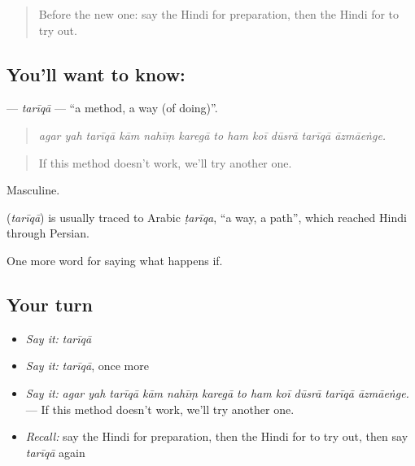 \label{lesson:HI-C392-tariqa}



\begin{quote}
Before the new one: say the Hindi for preparation, then the Hindi for to try out.
\end{quote}

\subsection*{You'll want to know: }
\textbf{} — \emph{tarīqā} — \textquotedblleft{}a method, a way (of doing)\textquotedblright{}.

\begin{quote}
           
\end{quote}

\begin{quote}
\emph{agar yah tarīqā kām nahīṃ karegā to ham koī dūsrā tarīqā āzmāeṅge.}
\end{quote}

\begin{quote}
If this method doesn't work, we'll try another one.
\end{quote}

Masculine.

\begin{cousinweb}
\textbf{} (\emph{tarīqā}) is usually traced to Arabic \emph{ṭarīqa}, \textquotedblleft{}a way, a path\textquotedblright{}, which reached Hindi through Persian.
\end{cousinweb}

\begin{grammarlens}[title={What you've built}]
One more word for saying what happens if.
\end{grammarlens}

\subsection*{Your turn}
\begin{itemize}
\raggedright
  \item \emph{Say it:} \emph{tarīqā}
  \item \emph{Say it:} \emph{tarīqā}, once more
  \item \emph{Say it:} \emph{agar yah tarīqā kām nahīṃ karegā to ham koī dūsrā tarīqā āzmāeṅge.} — If this method doesn't work, we'll try another one.
  \item \emph{Recall:} say the Hindi for preparation, then the Hindi for to try out, then say \emph{tarīqā} again
\end{itemize}

